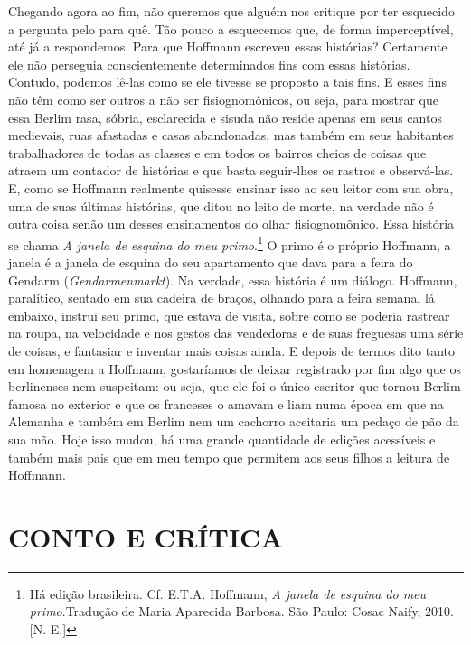Chegando agora ao fim, não queremos que alguém nos critique por ter
esquecido a pergunta pelo para quê. Tão pouco a esquecemos que, de forma
imperceptível, até já a respondemos. Para que Hoffmann escreveu essas
histórias? Certamente ele não perseguia conscientemente determinados
fins com essas histórias. Contudo, podemos lê-las como se ele tivesse se
proposto a tais fins. E esses fins não têm como ser outros a não ser
fisiognomônicos, ou seja, para mostrar que essa Berlim rasa, sóbria,
esclarecida e sisuda não reside apenas em seus cantos medievais, ruas
afastadas e casas abandonadas, mas também em seus habitantes
trabalhadores de todas as classes e em todos os bairros cheios de coisas
que atraem um contador de histórias e que basta seguir-lhes os rastros e
observá-las. E, como se Hoffmann realmente quisesse ensinar isso ao seu
leitor com sua obra, uma de suas últimas histórias, que ditou no leito
de morte, na verdade não é outra coisa senão um desses ensinamentos do
olhar fisiognomônico. Essa história se chama \emph{A janela de esquina
do meu primo}.\footnote{Há edição brasileira. Cf. E.T.A. Hoffmann,
  \emph{A janela de esquina do meu primo}.Tradução de Maria Aparecida
  Barbosa. São Paulo: Cosac Naify, 2010. [N. E.]} O
primo é o próprio Hoffmann, a janela é a janela de esquina do seu
apartamento que dava para a feira do Gendarm (\emph{Gendarmenmarkt}). Na
verdade, essa história é um diálogo. Hoffmann, paralítico, sentado em
sua cadeira de braços, olhando para a feira semanal lá embaixo, instrui
seu primo, que estava de visita, sobre como se poderia rastrear na
roupa, na velocidade e nos gestos das vendedoras e de suas freguesas uma
série de coisas, e fantasiar e inventar mais coisas ainda. E depois de
termos dito tanto em homenagem a Hoffmann, gostaríamos de deixar
registrado por fim algo que os berlinenses nem suspeitam: ou seja, que
ele foi o único escritor que tornou Berlim famosa no exterior e que os
franceses o amavam e liam numa época em que na Alemanha e também em
Berlim nem um cachorro aceitaria um pedaço de pão da sua mão. Hoje isso
mudou, há uma grande quantidade de edições acessíveis e também mais pais
que em meu tempo que permitem aos seus filhos a leitura de Hoffmann.

\part{CONTO E CRÍTICA}


